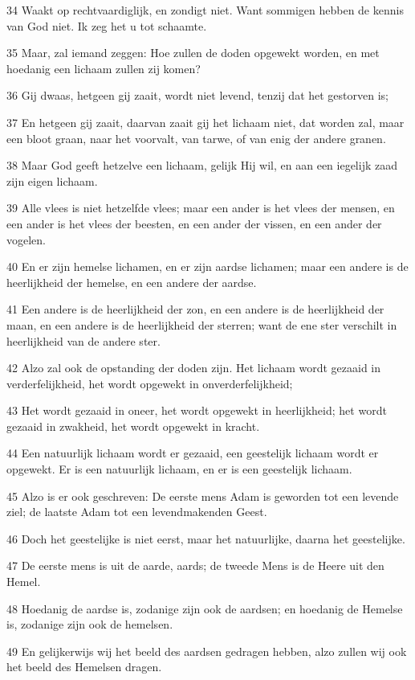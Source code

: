 \par 34 Waakt op rechtvaardiglijk, en zondigt niet. Want sommigen hebben de kennis van God niet. Ik zeg het u tot schaamte.
\par 35 Maar, zal iemand zeggen: Hoe zullen de doden opgewekt worden, en met hoedanig een lichaam zullen zij komen?
\par 36 Gij dwaas, hetgeen gij zaait, wordt niet levend, tenzij dat het gestorven is;
\par 37 En hetgeen gij zaait, daarvan zaait gij het lichaam niet, dat worden zal, maar een bloot graan, naar het voorvalt, van tarwe, of van enig der andere granen.
\par 38 Maar God geeft hetzelve een lichaam, gelijk Hij wil, en aan een iegelijk zaad zijn eigen lichaam.
\par 39 Alle vlees is niet hetzelfde vlees; maar een ander is het vlees der mensen, en een ander is het vlees der beesten, en een ander der vissen, en een ander der vogelen.
\par 40 En er zijn hemelse lichamen, en er zijn aardse lichamen; maar een andere is de heerlijkheid der hemelse, en een andere der aardse.
\par 41 Een andere is de heerlijkheid der zon, en een andere is de heerlijkheid der maan, en een andere is de heerlijkheid der sterren; want de ene ster verschilt in heerlijkheid van de andere ster.
\par 42 Alzo zal ook de opstanding der doden zijn. Het lichaam wordt gezaaid in verderfelijkheid, het wordt opgewekt in onverderfelijkheid;
\par 43 Het wordt gezaaid in oneer, het wordt opgewekt in heerlijkheid; het wordt gezaaid in zwakheid, het wordt opgewekt in kracht.
\par 44 Een natuurlijk lichaam wordt er gezaaid, een geestelijk lichaam wordt er opgewekt. Er is een natuurlijk lichaam, en er is een geestelijk lichaam.
\par 45 Alzo is er ook geschreven: De eerste mens Adam is geworden tot een levende ziel; de laatste Adam tot een levendmakenden Geest.
\par 46 Doch het geestelijke is niet eerst, maar het natuurlijke, daarna het geestelijke.
\par 47 De eerste mens is uit de aarde, aards; de tweede Mens is de Heere uit den Hemel.
\par 48 Hoedanig de aardse is, zodanige zijn ook de aardsen; en hoedanig de Hemelse is, zodanige zijn ook de hemelsen.
\par 49 En gelijkerwijs wij het beeld des aardsen gedragen hebben, alzo zullen wij ook het beeld des Hemelsen dragen.
